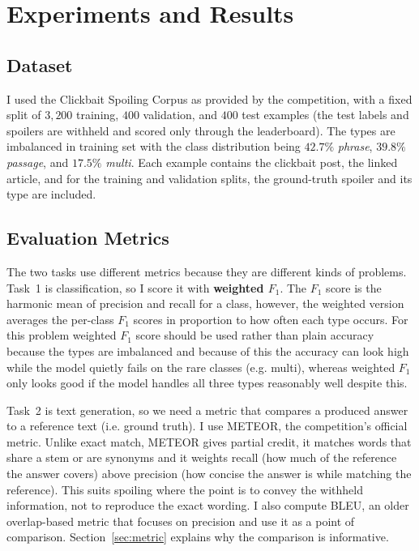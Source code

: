 \documentclass[11pt]{article}
\begin{document}
\section{Experiments and Results}
\label{sec:results}

\subsection{Dataset}
I used the Clickbait Spoiling Corpus as provided
by the competition, with a fixed split of $3{,}200$ training, $400$ validation,
and $400$ test examples (the test labels and spoilers are withheld and scored only through the
leaderboard). The types are imbalanced in training set with the class distribution being $42.7\%$ \textit{phrase}, $39.8\%$
\textit{passage}, and $17.5\%$ \textit{multi}. Each example contains the
clickbait post, the linked article, and for the training and validation splits,
the ground-truth spoiler and its type are included.

\subsection{Evaluation Metrics}
\label{sec:metrics}
The two tasks use different metrics because they are different kinds of problems.
Task~1 is classification, so I score it with \textbf{weighted $F_1$}. The $F_1$
score is the harmonic mean of precision and recall for a class, however, the weighted
version averages the per-class $F_1$ scores in proportion to how often each type
occurs. For this problem weighted $F_1$ score should be used rather than plain accuracy because the types are imbalanced and because of this the
accuracy can look high while the model quietly fails on the rare
classes (e.g. multi), whereas weighted $F_1$ only looks good if the model handles all three
types reasonably well despite this.

Task~2 is text generation, so we need a metric that compares a produced answer to
a reference text (i.e. ground truth). I use METEOR, the competition's official metric. Unlike
exact match, METEOR gives partial credit, it matches words that share a stem or
are synonyms and it weights recall (how much of the reference the answer covers)
above precision (how concise the answer is while matching the reference). This suits spoiling where the point
is to convey the withheld information, not to reproduce the exact wording. I also
compute BLEU, an older overlap-based metric that focuses on precision and use it
as a point of comparison. Section~\ref{sec:metric} explains why the comparison is
informative.
\end{document}
